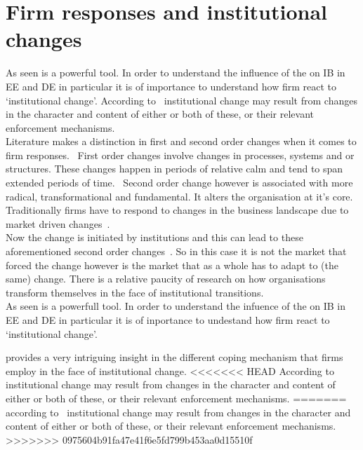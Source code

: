 \section{Firm responses and institutional changes}



As seen \inth is a powerful tool.
In order to understand the influence of the \wto on IB in EE and DE in particular it is of importance to understand how firm react to `institutional change'.
According to~\cite{North:1990vl} institutional change may result from changes in the character and content of either or both of these, or their relevant enforcement mechanisms.\\
Literature makes a distinction in first and second order changes when it comes to firm responses.~\cite{Meyer:1993}
First order changes involve changes in processes, systems and or structures. These changes happen in periods of relative calm and tend to span extended periods of time.~\cite{Dutton:1991gk,FoxWolfgramm:1998vu,Tushman:1985}
Second order change however is associated with more radical, transformational and fundamental.
It alters the organisation at it's core.~\cite{Meyer:1982ug,Meyer:1993,Tushman:1985, Newman:2000fc}
Traditionally firms have to respond to changes in the business landscape due to market driven changes~\cite{Chittoor:2008cj}.\\
Now the change is initiated by institutions and this can lead to these aforementioned second order changes~\cite{Chittoor:2009jh}.
So in this case it is not the market that forced the change however is the market that as a whole has to adapt to (the same) change.
There is a relative paucity of research on how organisations transform themselves in the face of institutional transitions.~\cite{Chittoor:2008cj}\\

As seen \inth is a powerfull tool.
In order to understand the infuence of the \wto on IB in EE and DE in particular it is of inportance to undestand how firm react to `institutional change'.

\cite{Cantwell:2009hg} provides a very intriguing insight in the different coping mechanism that firms employ in the face of institutional change.
<<<<<<< HEAD
According to~\cite{North:1990vl} institutional change may result from changes in the character and content of either or both of these, or their relevant enforcement mechanisms.
=======
according to~\cite{North:1990vl} institutional change may result from changes in the character and content of either or both of these, or their relevant enforcement mechanisms.
>>>>>>> 0975604b91fa47e41f6e5fd799b453aa0d15510f

